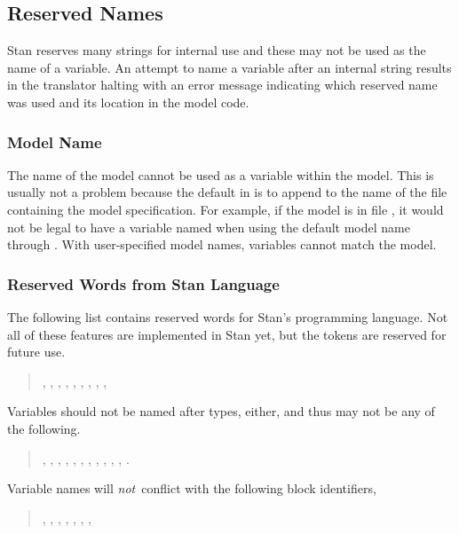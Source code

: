 \subsection{Reserved Names}

Stan reserves many strings for internal use and these may not be used
as the name of a variable.  An attempt to name a variable after an
internal string results in the  translator halting with an
error message indicating which reserved name was used and its location
in the model code.

\subsubsection{Model Name}

The name of the model cannot be used as a variable within the model.
This is usually not a problem because the default in 
is to append  to the name of the file containing the
model specification.  For example, if the model is in file
, it would not be legal to have a variable named
 when using the default model name through
.  With user-specified model names, variables cannot
match the model.

\subsubsection{Reserved Words from Stan Language}

The following list contains reserved words for Stan's programming
language.  Not all of these features are implemented in Stan yet, but
the tokens are reserved for future use.
%
\begin{quote}
,
,
,
,
,
,
,
,
, 
\end{quote}
%
Variables should not be named after types, either, and thus may not be
any of the following.
%
\begin{quote}
,
,
,
,
,
,
,
,
,
,
,
.
\end{quote}
%
Variable names will {\it not}\ conflict with the following block identifiers,
%
\begin{quote}
,
,
,
,
,
, 
,
\end{quote}
%

